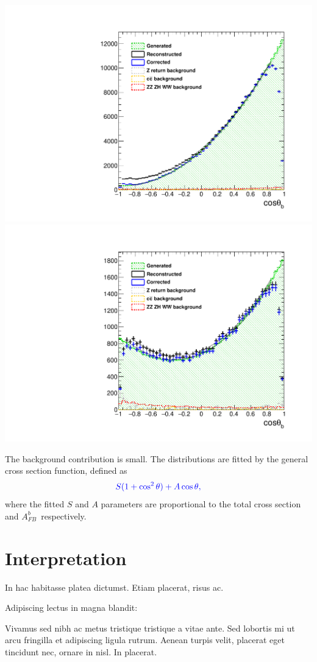 \documentclass[a0,portrait]{a0poster}
\newcommand{\afb}{$A_{FB}^b$}
\begin{document}
\begin{multicols}{2}
\begin{center}\vspace{1cm}
	\label{fig:BAsymmetryFinal_3}
	\includegraphics[width=0.4\linewidth]{../ILD/plots/basymmetry-final-left.pdf}
	\includegraphics[width=0.4\linewidth]{../ILD/plots/basymmetry-final-right.pdf}
\end{center}\vspace{1cm}

The background contribution is small. 
The distributions are fitted by the general cross section function, defined as 
\begin{equation}
{\color{Blue}	S (1+\cos^2\theta) + A \cos\theta,}
\end{equation}
where the fitted $S$ and $A$ parameters are proportional to the total cross section and \afb\, respectively.
\section*{Interpretation}



In hac habitasse platea dictumst. Etiam placerat, risus ac.

Adipiscing lectus in magna blandit:


Vivamus sed nibh ac metus tristique tristique a vitae ante. Sed lobortis mi ut arcu fringilla et adipiscing ligula rutrum. Aenean turpis velit, placerat eget tincidunt nec, ornare in nisl. In placerat.


\end{multicols}
\end{document}
